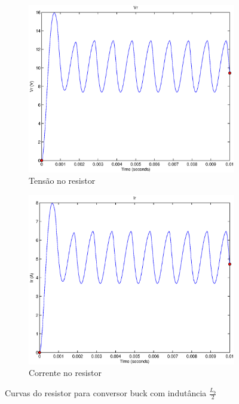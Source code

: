 \documentclass{article}
\begin{document}
\begin{figure}[H]
	\centering
	\begin{subfigure}[b]{0.4\linewidth}
		\includegraphics[width=\linewidth]{matlab/buck/b_vr2}
		\caption{Tensão no resistor}
	\end{subfigure}
	\begin{subfigure}[b]{0.4\linewidth}
		\centering
		\includegraphics[width=\linewidth]{matlab/buck/b_ir2}
		\caption{Corrente no resistor}
	\end{subfigure}
	\caption{Curvas do resistor para conversor buck com indutância $\frac{L_b}{2}$}
	\label{fig:br2}
\end{figure}
\end{document}
